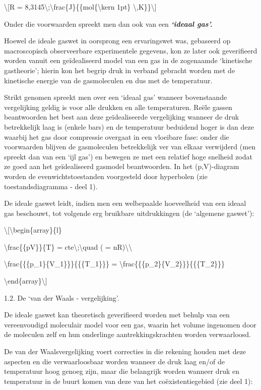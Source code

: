 \documentclass[]{article}
\begin{document}
\textbackslash{}{[}R =
8,3145\textbackslash{};\textbackslash{}frac\{J\}\{\{mol\{\textbackslash{}kern
1pt\} \textbackslash{},K\}\}\textbackslash{}{]}

Onder die voorwaarden spreekt men dan ook van een \emph{\textbf{`ideaal
gas'.}}

Hoewel de ideale gaswet in oorsprong een ervaringswet was, gebaseerd op
macroscopisch observeerbare experimentele gegevens, kon ze later ook
geverifieerd worden vanuit een geïdealiseerd model van een gas in de
zogenaamde `kinetische gastheorie'; hierin kon het begrip druk in
verband gebracht worden met de kinetische energie van de gasmoleculen en
dus met de temperatuur.

Strikt genomen spreekt men over een `ideaal gas' wanneer bovenstaande
vergelijking geldig is voor alle drukken en alle temperaturen. Reële
gassen beantwoorden het best aan deze geïdealiseerde vergelijking
wanneer de druk betrekkelijk laag is (enkele bars) en de temperatuur
beduidend hoger is dan deze waarbij het gas door compressie overgaat in
een vloeibare fase: onder die voorwaarden blijven de gasmoleculen
betrekkelijk ver van elkaar verwijderd (men spreekt dan van een `ijl
gas') en bewegen ze met een relatief hoge snelheid zodat ze goed aan het
geïdealiseerd gasmodel beantwoorden. In het (p,V)-diagram worden de
evenwichtstoestanden voorgesteld door hyperbolen (zie toestandsdiagramma
- deel 1).

De ideale gaswet leidt, indien men een welbepaalde hoeveelheid van een
ideaal gas beschouwt, tot volgende erg bruikbare uitdrukkingen (de
`algemene gaswet'):

\textbackslash{}{[}\textbackslash{}begin\{array\}\{l\}

\textbackslash{}frac\{\{pV\}\}\{T\} =
cte\textbackslash{};\textbackslash{}quad ( =
nR)\textbackslash{}\textbackslash{}

\textbackslash{}frac\{\{\{p\_1\}\{V\_1\}\}\}\{\{\{T\_1\}\}\} =
\textbackslash{}frac\{\{\{p\_2\}\{V\_2\}\}\}\{\{\{T\_2\}\}\}

\textbackslash{}end\{array\}\textbackslash{}{]}

1.2. De `van der Waals - vergelijking'.

De ideale gaswet kan theoretisch geverifieerd worden met behulp van een
vereenvoudigd moleculair model voor een gas, waarin het volume ingenomen
door de moleculen zelf en hun onderlinge aantrekkingskrachten worden
verwaarloosd.

De van der Waalsvergelijking voert correcties in die rekening houden met
deze aspecten en die verwaarloosbaar worden wanneer de druk laag en/of
de temperatuur hoog genoeg zijn, maar die belangrijk worden wanneer druk
en temperatuur in de buurt komen van deze van het coëxistentiegebied
(zie deel 1):
\end{document}
